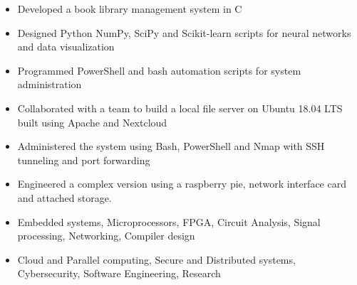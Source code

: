 \documentclass[11pt,a4paper,ragged2e]{altacv}
\begin{document}
\begin{paracol}{1}
\begin{itemize}
\item Developed a book library management system in C 
\item Designed Python NumPy, SciPy and Scikit-learn scripts for neural networks and data visualization
\item Programmed PowerShell and bash automation scripts for system administration
\end{itemize}
\tightdivider

\begin{itemize}
\item Collaborated with a team to build a local file server on Ubuntu 18.04 LTS built using Apache and Nextcloud
\item Administered the system using Bash, PowerShell and Nmap with SSH tunneling and port forwarding
\item Engineered a complex version using a raspberry pie, network interface card and attached storage.
\end{itemize}

\medskip

\begin{itemize}
\item Embedded systems, Microprocessors, FPGA, Circuit Analysis, Signal processing, Networking,  Compiler design
\item Cloud and Parallel computing, Secure and Distributed systems, Cybersecurity, Software Engineering, Research
\end{itemize}




\end{paracol}
\end{document}
